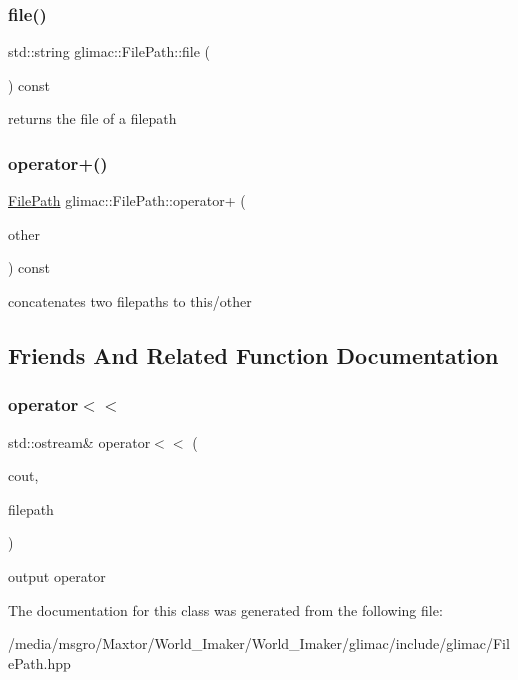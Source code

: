 \subsubsection{\texorpdfstring{file()}{file()}}
{\footnotesize\ttfamily std\+::string glimac\+::\+File\+Path\+::file (\begin{DoxyParamCaption}{ }\end{DoxyParamCaption}) const\hspace{0.3cm}{\ttfamily [inline]}}

returns the file of a filepath \mbox{\label{classglimac_1_1FilePath_a8113825c73d8a8f1f1cf3ca57de6bad8}} 
\subsubsection{\texorpdfstring{operator+()}{operator+()}}
{\footnotesize\ttfamily \hyperlink{classglimac_1_1FilePath}{File\+Path} glimac\+::\+File\+Path\+::operator+ (\begin{DoxyParamCaption}\item[{const \hyperlink{classglimac_1_1FilePath}{File\+Path} \&}]{other }\end{DoxyParamCaption}) const\hspace{0.3cm}{\ttfamily [inline]}}

concatenates two filepaths to this/other 

\subsection{Friends And Related Function Documentation}
\mbox{\label{classglimac_1_1FilePath_a924c4e68c4618cf40156646d23ec5f1c}} 
\subsubsection{\texorpdfstring{operator$<$$<$}{operator<<}}
{\footnotesize\ttfamily std\+::ostream\& operator$<$$<$ (\begin{DoxyParamCaption}\item[{std\+::ostream \&}]{cout,  }\item[{const \hyperlink{classglimac_1_1FilePath}{File\+Path} \&}]{filepath }\end{DoxyParamCaption})\hspace{0.3cm}{\ttfamily [friend]}}

output operator 

The documentation for this class was generated from the following file\+:\begin{DoxyCompactItemize}
\item 
/media/msgro/\+Maxtor/\+World\+\_\+\+Imaker/\+World\+\_\+\+Imaker/glimac/include/glimac/File\+Path.\+hpp\end{DoxyCompactItemize}
